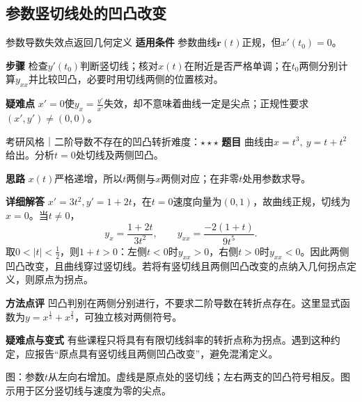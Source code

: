 \subsection{参数竖切线处的凹凸改变}
\begin{method}{参数导数失效点返回几何定义}
\textbf{适用条件} 参数曲线$\bm r(t)$正规，但$x'(t_0)=0$。\par
\textbf{步骤} 检查$y'(t_0)$判断竖切线；核对$x(t)$在附近是否严格单调；在$t_0$两侧分别计算$y_{xx}$并比较凹凸，必要时用切线两侧的位置核对。\par
\textbf{疑难点} $x'=0$使$y_x=\frac{y'}{x'}$失效，却不意味着曲线一定是尖点；正规性要求$(x',y')\ne(0,0)$。
\end{method}
\begin{example}{考研风格｜二阶导数不存在的凹凸转折}{难度：$\star\star\star$}\label{cd:ex:vertical-inflection}
\textbf{题目} 曲线由$x=t^3,\ y=t+t^2$给出。分析$t=0$处切线及两侧凹凸。\par
\textbf{思路} $x(t)$严格递增，所以$t$两侧与$x$两侧对应；在非零$t$处用参数求导。\par
\textbf{详细解答} $x'=3t^2,y'=1+2t$，在$t=0$速度向量为$(0,1)$，故曲线正规，切线为$x=0$。当$t\ne0$，
\[
 y_x=\dfrac{1+2t}{3t^2},\qquad
 y_{xx}=\dfrac{-2(1+t)}{9t^5}.
\]
取$0<|t|<\frac{1}{2}$，则$1+t>0$：左侧$t<0$时$y_{xx}>0$，右侧$t>0$时$y_{xx}<0$。因此两侧凹凸改变，且曲线穿过竖切线。若将有竖切线且两侧凹凸改变的点纳入几何拐点定义，则原点为拐点。\par
\textbf{方法点评} 凹凸判别在两侧分别进行，不要求二阶导数在转折点存在。这里显式函数为$y=x^{\frac{1}{3}}+x^{\frac{2}{3}}$，可独立核对两侧符号。\par
\textbf{疑难点与变式} 有些课程只将具有有限切线斜率的转折点称为拐点。遇到这种约定，应报告“原点具有竖切线且两侧凹凸改变”，避免混淆定义。
\end{example}
\begin{center}
\par\small 图：参数$t$从左向右增加。虚线是原点处的竖切线；左右两支的凹凸符号相反。图示用于区分竖切线与速度为零的尖点。
\end{center}


